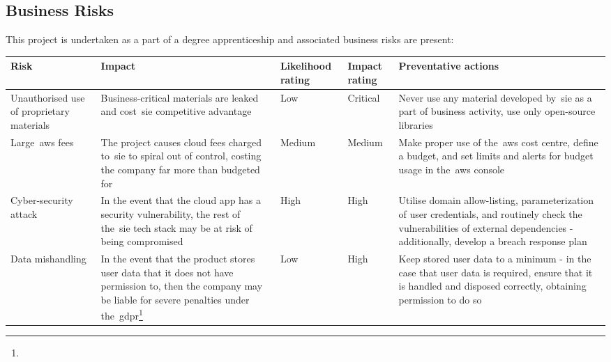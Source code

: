 \begin{tabularx}{\textwidth}{szssz}
\end{tabularx}

\subsection{Business Risks}\label{subsec:business-risks}
This project is undertaken as a part of a degree apprenticeship and associated business risks are present:

\begin{tabularx}{\textwidth}{szssz}
    \caption{Business Risks}\label{tab:business-risks}\\
    \hline
    \textbf{Risk} & \textbf{Impact} & \textbf{Likelihood rating} & \textbf{Impact rating} & \textbf{Preventative actions} \\\hline
    Unauthorised use of proprietary materials & Business-critical materials are leaked and cost~\gls{sie} competitive advantage & Low & Critical & Never use any material developed by~\gls{sie} as a part of business activity, use only open-source libraries\\\hline
    Large~\gls{aws} fees & The project causes cloud fees charged to~\gls{sie} to spiral out of control, costing the company far more than budgeted for & Medium & Medium & Make proper use of the~\gls{aws} cost centre, define a budget, and set limits and alerts for budget usage in the~\gls{aws} console \\\hline
    Cyber-security attack & In the event that the cloud app has a security vulnerability, the rest of the~\gls{sie} tech stack may be at risk of being compromised & High & High & Utilise domain allow-listing, parameterization of user credentials, and routinely check the vulnerabilities of external dependencies - additionally, develop a breach response plan \\\hline
    Data mishandling & In the event that the product stores user data that it does not have permission to, then the company may be liable for severe penalties under the~\gls{gdpr}\footnote{} & Low & High & Keep stored user data to a minimum - in the case that user data is required, ensure that it is handled and disposed correctly, obtaining permission to do so

\end{tabularx}
